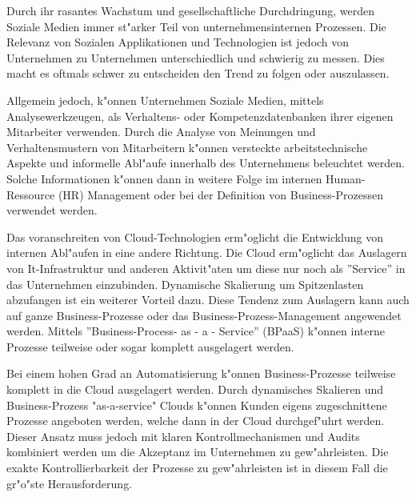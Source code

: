 Durch ihr rasantes Wachstum und gesellschaftliche Durchdringung, werden Soziale Medien immer st"arker Teil von unternehmensinternen Prozessen. Die Relevanz von Sozialen Applikationen und Technologien ist jedoch von Unternehmen zu Unternehmen unterschiedlich und schwierig zu messen. Dies macht es oftmals schwer zu entscheiden den Trend zu folgen oder auszulassen.
\cite{Nair2011}

Allgemein jedoch, k"onnen Unternehmen Soziale Medien, mittels Analysewerkzeugen, als Verhaltens- oder Kompetenzdatenbanken ihrer eigenen Mitarbeiter verwenden. Durch die Analyse von Meinungen und Verhaltensmustern von Mitarbeitern k"onnen versteckte arbeitstechnische Aspekte und informelle Abl"aufe innerhalb des Unternehmens beleuchtet werden. Solche Informationen k"onnen dann in weitere Folge im internen Human-Ressource (HR) Management oder bei der Definition von Business-Prozessen verwendet werden. \cite{Sinha2012}

Das voranschreiten von Cloud-Technologien erm"oglicht die Entwicklung von internen Abl"aufen in eine andere Richtung. Die Cloud erm"oglicht das Auslagern von It-Infrastruktur und anderen Aktivit"aten um diese nur noch als ''Service'' in das Unternehmen einzubinden. Dynamische Skalierung um Spitzenlasten abzufangen ist ein weiterer Vorteil dazu. Diese Tendenz zum Auslagern kann auch auf ganze Business-Prozesse oder das Business-Prozess-Management angewendet werden. Mittels ''Business-Process- as - a - Service'' (BPaaS) k"onnen interne Prozesse teilweise oder sogar komplett ausgelagert werden. \cite{Stoitsev2012}

Bei einem hohen Grad an Automatisierung k"onnen Business-Prozesse teilweise komplett in die Cloud ausgelagert werden. Durch dynamisches Skalieren und Business-Prozess "as-a-service" Clouds k"onnen Kunden eigens zugeschnittene Prozesse angeboten werden, welche dann in der Cloud durchgef"uhrt werden. Dieser Ansatz muss jedoch mit klaren Kontrollmechanismen und Audits kombiniert werden um die Akzeptanz im Unternehmen zu gew"ahrleisten. Die exakte Kontrollierbarkeit der Prozesse zu gew"ahrleisten ist in diesem Fall die gr"o"ste Herausforderung. \cite{Accorsi2011}